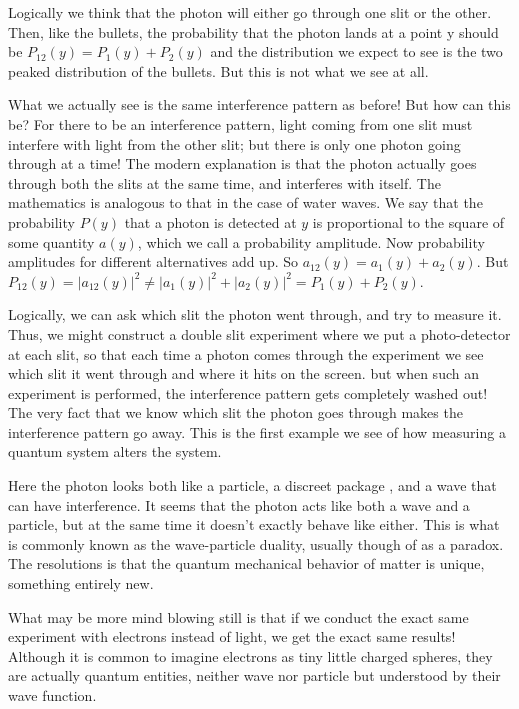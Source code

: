 \documentclass[12pt, oneside]{book}
\theoremstyle{definition}
\theoremstyle{definition}
\theoremstyle{remark}
\begin{document}
Logically we think that the photon will either go through one slit or the other. Then, like the bullets, the probability that the photon lands at a point y should be $P_{12}(y)=P_1(y)+P_2(y)$ and the distribution we expect to see is the two peaked distribution of the bullets. But this is not what we see at all.

What we actually see is the same interference pattern as before! But how can this be? For there to be an interference pattern, light coming from one slit must interfere with light from the other slit; but there is only one photon going through at a time! The modern explanation is that the photon actually goes through both the slits at the same time, and interferes with itself. The mathematics is analogous to that in the case of water waves. We say that the probability $P(y)$ that a photon is detected at $y$ is proportional to the square of some quantity $a(y)$, which we call a probability amplitude. Now probability amplitudes for different alternatives add up. So $a_{12}(y)=a_{1}(y)+a_2(y)$. But $P_{12}(y)=|a_{12}(y)|^2\neq |a_1(y)|^2+|a_2(y)|^2=P_1(y)+P_2(y)$.

Logically, we can ask which slit the photon went through, and try to measure it. Thus, we might construct a double slit experiment where we put a photo-detector at each slit, so that each time a photon comes through the experiment we see which slit it went through and where it hits on the screen. but when such an experiment is performed, the interference pattern gets completely washed out! The very fact that we know which slit the photon goes through makes the interference pattern go away. This is the first example we see of how measuring a quantum system alters the system.

Here the photon looks both like a particle, a discreet package , and a wave that can have interference. It seems that the photon acts like both a wave and a particle, but at the same time it doesn't exactly behave like either. This is what is commonly known as the wave-particle duality, usually though of as a paradox. The resolutions is that the quantum mechanical behavior of matter is unique, something entirely new.

What may be more mind blowing still is that if we conduct the exact same experiment with electrons instead of light, we get the exact same results! Although it is common to imagine electrons as tiny little charged spheres, they are actually quantum entities, neither wave nor particle but understood by their wave function.
\end{document}
